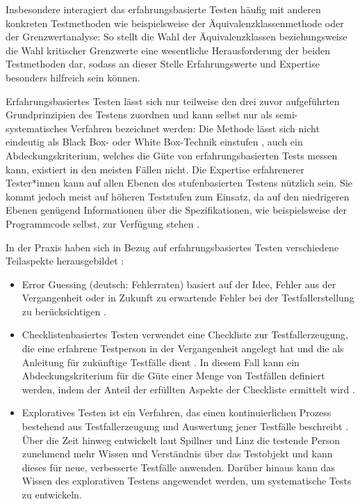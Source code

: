 Insbesondere interagiert das erfahrungsbasierte Testen häufig mit anderen konkreten Testmethoden wie beispielsweise der Äquivalenzklassenmethode oder der Grenzwertanalyse: So stellt die Wahl der Äquivalenzklassen beziehungsweise die Wahl kritischer Grenzwerte eine wesentliche Herausforderung der beiden Testmethoden dar, sodass an dieser Stelle Erfahrungswerte und Expertise besonders hilfreich sein können.

Erfahrungsbasiertes Testen lässt sich nur teilweise den drei zuvor aufgeführten Grundprinzipien des Testens zuordnen und kann selbst nur als \glqq semi-systematisches\grqq{} Verfahren bezeichnet werden: Die Methode lässt sich nicht eindeutig als Black Box- oder White Box-Technik einstufen \cite[S. 213]{spillner2010basiswissen}, auch ein Abdeckungskriterium, welches die Güte von erfahrungsbasierten Tests messen kann, existiert in den meisten Fällen nicht. Die Expertise erfahrenerer Tester*innen kann auf allen Ebenen des stufenbasierten Testens nützlich sein. Sie kommt jedoch meist auf höheren Teststufen zum Einsatz, da auf den niedrigeren Ebenen genügend Informationen über die Spezifikationen, wie beispielsweise der Programmcode selbst, zur Verfügung stehen \cite[S. 213]{spillner2010basiswissen}.

In der Praxis haben sich in Bezug auf erfahrungsbasiertes Testen verschiedene Teilaspekte herausgebildet \cite[S.210 ff.]{spillner2010basiswissen}:
\begin{itemize}
\item \glqq Error Guessing\grqq{} (deutsch: Fehlerraten) basiert auf der Idee, Fehler aus der Vergangenheit oder in Zukunft zu erwartende Fehler bei der Testfallerstellung zu berücksichtigen \cite[S.210 f.]{spillner2010basiswissen}.
\item Checklistenbasiertes Testen verwendet eine Checkliste zur Testfallerzeugung, die eine erfahrene Testperson in der Vergangenheit angelegt hat und die als Anleitung für zukünftige Testfälle dient \cite[S. 211 f.]{spillner2010basiswissen}. In diesem Fall kann ein Abdeckungskriterium für die Güte einer Menge von Testfällen definiert werden, indem der Anteil der erfüllten Aspekte der Checkliste ermittelt wird \cite[S. 211]{spillner2010basiswissen}.
\item Exploratives Testen ist ein Verfahren, das einen kontinuierlichen Prozess bestehend aus Testfallerzeugung und Auswertung jener Testfälle beschreibt \cite[S. 211]{spillner2010basiswissen}. Über die Zeit hinweg entwickelt laut Spillner und Linz \cite[S. 212]{spillner2010basiswissen} die testende Person zunehmend mehr Wissen und Verständnis über das Testobjekt und kann dieses für neue, verbesserte Testfälle anwenden. Darüber hinaus kann das Wissen des explorativen Testens angewendet werden, um systematische Tests zu entwickeln.
\end{itemize}

